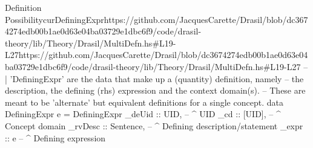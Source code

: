 \begin{haskell}{Definition Possibility}{curDefiningExpr}{https://github.com/JacquesCarette/Drasil/blob/dc3674274edb00b1ae0d63e04ba03729e1dbc\newline{}6f9/code/drasil-theory/lib/Theory/Drasil/MultiDefn.hs\#L19-L27}{https://github.com/JacquesCarette/Drasil/blob/dc3674274edb00b1ae0d63e04ba03729e1dbc6f9/code/drasil-theory/lib/Theory/Drasil/MultiDefn.hs\#L19-L27}
-- | 'DefiningExpr' are the data that make up a (quantity) definition, namely
--   the description, the defining (rhs) expression and the context domain(s).
--   These are meant to be 'alternate' but equivalent definitions for a single concept.
data DefiningExpr e = DefiningExpr {
  _deUid  :: UID,      -- ^ UID
  _cd     :: [UID],    -- ^ Concept domain
  _rvDesc :: Sentence, -- ^ Defining description/statement
  _expr   :: e         -- ^ Defining expression
}
\end{haskell}
